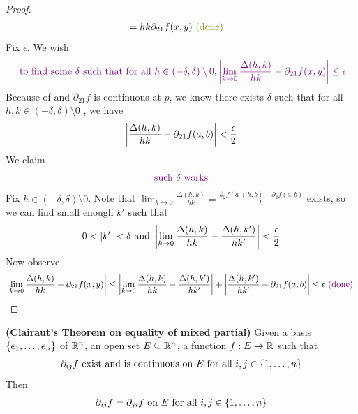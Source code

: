 \documentclass{report}
\begin{document}
\begin{proof}
\begin{align*}
&=hk\partial_{21}f(x,y)\odone
\end{align*}
Fix $\epsilon $. We wish 
\begin{align*}
  \textcolor{violet}{\text{ to find some $\delta$ such that for all }h \in (-\delta,\delta)\setminus 0, \left|\lim_{k\to 0}\frac{\Delta (h,k)}{hk}-\partial_{21}f(x,y)\right|\leq \epsilon }
\end{align*}
Because of  and $\partial_{21}f$ is continuous at $p$, we know there exists $\delta$ such that for all $h,k\in (-\delta,\delta)\setminus 0$ , we have 
\begin{align*}
  \left|\frac{\Delta ( h,k)}{hk}-\partial_{21}f(a,b)\right|<\frac{\epsilon }{2} 
\end{align*}
We claim 
\begin{align*}
\textcolor{violet}{\text{ such }\delta\text{ works }}
\end{align*}
Fix $h\in (-\delta,\delta)\setminus 0$. Note that $\lim_{k\to 0}\frac{\Delta (h,k)}{hk}=\frac{\partial_2 f(a+h,b)-\partial_2 f(a,b)}{h}$ exists, so we can find small enough $k'$ such that
\begin{align*}
  0<\left|k'\right|<\delta \text{ and } \left|\lim_{k\to 0} \frac{\Delta (h,k)}{hk}- \frac{\Delta (h,k')}{hk'}\right|<\frac{\epsilon}{2}
\end{align*}
Now observe 
\begin{align*}
\left|\lim_{k\to 0}\frac{\Delta (h,k)}{hk}-\partial_{21}f(x,y)\right|\leq \left|\lim_{k\to 0}\frac{\Delta (h,k)}{hk}-\frac{\Delta (h,k')}{hk'}\right|+ \left|\frac{\Delta (h,k')}{hk'}-\partial_{21}f(a,b)\right|\leq \epsilon \textcolor{violet}{\text{ (done) }}
\end{align*}





\end{proof}
\begin{corollary}
\textbf{(Clairaut's Theorem on equality of mixed partial)} Given a basis $\{ e_1,\dots ,e_n \}$ of $\mathbb{R}^n$, an open set $E\subseteq \mathbb{R}^n$, a function $f:E\rightarrow \mathbb{R}$ such that 
\begin{align*}
\partial_{ij}f\text{ exist and is continuous on }E\text{ for all }i,j \in \{ 1,\dots ,n \}
\end{align*}
Then 
\begin{align*}
\partial_{ij}f=\partial_{ji}f\text{ on $E$ for all }i,j\in \{ 1,\dots ,n \}
\end{align*}
\end{corollary}
\end{document}
